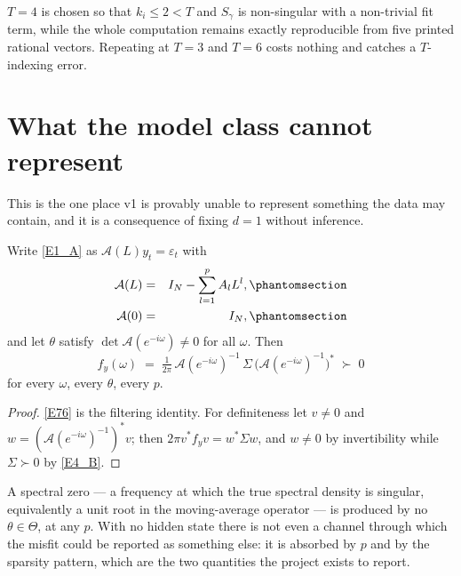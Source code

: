 $T=4$ is chosen so that $k_i\le2<T$ and $S_\gamma$ is non-singular with a non-trivial
fit term, while the whole computation remains exactly reproducible from five printed
rational vectors. Repeating at $T=3$ and $T=6$ costs nothing and catches a
$T$-indexing error.


\section{What the model class cannot represent}\label{sec:cannot}

This is the one place v1 is provably unable to represent something the data may
contain, and it is a consequence of fixing $d=1$ without inference.

\begin{proposition}\label{prop:spec}
Write \eqref{E1_A} as $\mathcal{A}(L)y_t=\varepsilon_t$ with
\begin{eqnarray}
\mathcal{A}(L) &=& I_N - \sum_{l=1}^{p}A_lL^l,
  \Elabel{E-6A}{E6_A} \\
\mathcal{A}(0) &=& I_N,
  \Elabel{E-6B}{E6_B}
\end{eqnarray}
and let $\theta$ satisfy $\det\mathcal{A}(e^{-i\omega})\ne0$ for all $\omega$. Then
\begin{equation}
f_y(\omega) \;=\; \tfrac{1}{2\pi}\,\mathcal{A}(e^{-i\omega})^{-1}\,\Sigma\,
\bigl(\mathcal{A}(e^{-i\omega})^{-1}\bigr)^{*} \;\succ\; 0
\tag{E-76}\label{E76}
\end{equation}
for every $\omega$, every $\theta$, every $p$.
\end{proposition}

\begin{proof}
\eqref{E76} is the filtering identity. For definiteness let $v\ne0$ and
$w=(\mathcal{A}(e^{-i\omega})^{-1})^*v$; then $2\pi v^*f_yv=w^*\Sigma w$, and $w\ne0$
by invertibility while $\Sigma\succ0$ by \eqref{E4_B}.
\end{proof}

\begin{corollary}\label{cor:overdiff}
A spectral zero --- a frequency at which the true spectral density is singular,
equivalently a unit root in the moving-average operator --- is produced by no
$\theta\in\Theta$, at any $p$. With no hidden state there is not even a channel
through which the misfit could be reported as something else: it is absorbed by $p$
and by the sparsity pattern, which are the two quantities the project exists to
report.
\end{corollary}

